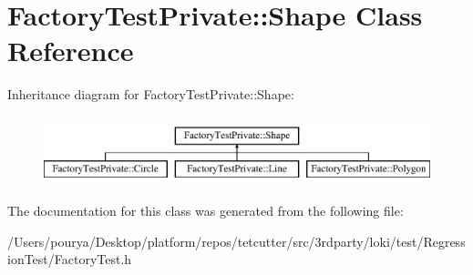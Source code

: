 \hypertarget{classFactoryTestPrivate_1_1Shape}{}\section{Factory\+Test\+Private\+:\+:Shape Class Reference}
\label{classFactoryTestPrivate_1_1Shape}
Inheritance diagram for Factory\+Test\+Private\+:\+:Shape\+:\begin{figure}[H]
\begin{center}
\leavevmode
\includegraphics[height=2.000000cm]{classFactoryTestPrivate_1_1Shape}
\end{center}
\end{figure}


The documentation for this class was generated from the following file\+:\begin{DoxyCompactItemize}
\item 
/\+Users/pourya/\+Desktop/platform/repos/tetcutter/src/3rdparty/loki/test/\+Regression\+Test/Factory\+Test.\+h\end{DoxyCompactItemize}
